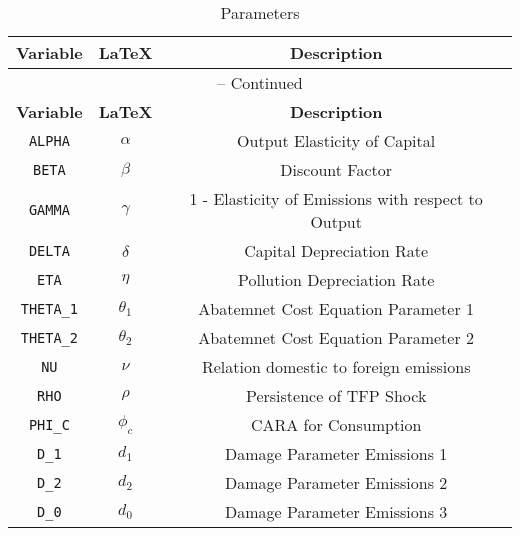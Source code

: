 \begin{center}
\begin{longtable}{ccc}
\caption{Parameters}\\%
\hline%
\multicolumn{1}{c}{\textbf{Variable}} &
\multicolumn{1}{c}{\textbf{\LaTeX}} &
\multicolumn{1}{c}{\textbf{Description}}\\%
\hline\hline%
\endfirsthead
\multicolumn{3}{c}{{\tablename} \thetable{} -- Continued}\\%
\hline%
\multicolumn{1}{c}{\textbf{Variable}} &
\multicolumn{1}{c}{\textbf{\LaTeX}} &
\multicolumn{1}{c}{\textbf{Description}}\\%
\hline\hline%
\endhead
\texttt{ALPHA} & ${\alpha}$ & Output Elasticity of Capital\\
\texttt{BETA} & ${\beta}$ & Discount Factor\\
\texttt{GAMMA} & ${\gamma}$ & 1 - Elasticity of Emissions with respect to Output\\
\texttt{DELTA} & ${\delta}$ & Capital Depreciation Rate\\
\texttt{ETA} & ${\eta}$ & Pollution Depreciation Rate\\
\texttt{THETA\_1} & ${\theta_1}$ & Abatemnet Cost Equation Parameter 1\\
\texttt{THETA\_2} & ${\theta_2}$ & Abatemnet Cost Equation Parameter 2\\
\texttt{NU} & ${\nu}$ & Relation domestic to foreign emissions\\
\texttt{RHO} & ${\rho}$ & Persistence of TFP Shock\\
\texttt{PHI\_C} & ${\phi_c}$ & CARA for Consumption\\
\texttt{D\_1} & ${d_1}$ & Damage Parameter Emissions 1\\
\texttt{D\_2} & ${d_2}$ & Damage Parameter Emissions 2\\
\texttt{D\_0} & ${d_0}$ & Damage Parameter Emissions 3\\
\hline%
\end{longtable}
\end{center}
